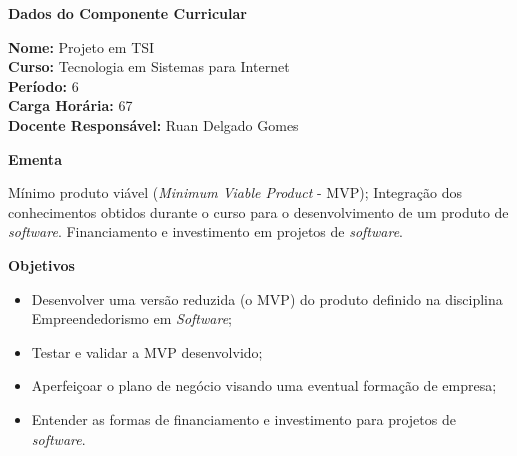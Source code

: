 

\begin{snugshade}\begin{center}\textbf{
    Dados do Componente Curricular
}\end{center}\end{snugshade}

\noindent \textbf{Nome:}                Projeto em TSI
\\        \textbf{Curso:}               Tecnologia em Sistemas para Internet
\\        \textbf{Período:}             \unit{6}{\degree}
\\        \textbf{Carga Horária:}       \unit{67}{\hour}
\\        \textbf{Docente Responsável:} Ruan Delgado Gomes


\begin{snugshade}\begin{center}\textbf{
    Ementa
\vphantom{q}}\end{center}\end{snugshade}

\noindent
M\'inimo produto vi\'avel (\textit{Minimum Viable Product} - MVP); Integra\c{c}\~ao dos conhecimentos obtidos durante o curso para o desenvolvimento de um produto de \textit{software}. Financiamento e investimento em projetos de \textit{software}.


\begin{snugshade}\begin{center}\textbf{
    Objetivos
}\end{center}\end{snugshade}

\begin{itemize}

\item Desenvolver uma vers\~ao reduzida (o MVP) do produto definido na disciplina Empreendedorismo em \textit{Software};

\item Testar e validar a MVP desenvolvido;

\item Aperfei\c{c}oar o plano de neg\'ocio visando uma eventual forma\c{c}\~ao de empresa;

\item Entender as formas de financiamento e investimento para projetos de \textit{software}.

\end{itemize} 

